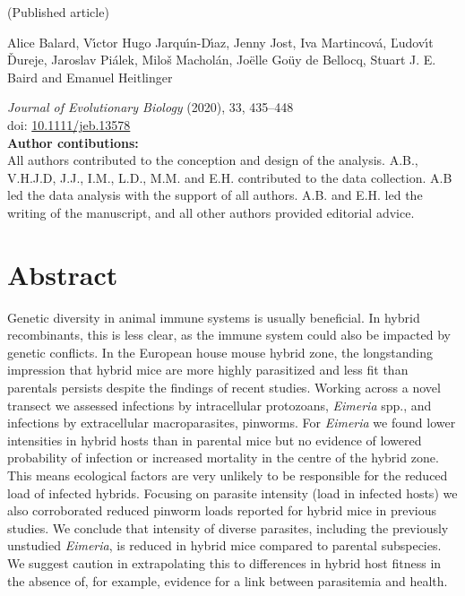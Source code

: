 (Published article) \par

Alice Balard, V{\'{\i}}ctor Hugo Jarqu{\'{\i}}n-D{\'{\i}}az, Jenny Jost, Iva Martincov{\'{a}}, {\v{L}}udov{\'{\i}}t {\v{D}}ureje, Jaroslav Pi{\'{a}}lek, Milo{\v{s}} Machol{\'{a}}n, Joëlle Go\"{u}y de Bellocq, Stuart J. E. Baird and Emanuel Heitlinger \par
  
\textit{Journal of Evolutionary Biology} (2020), 33, 435–448 \\
doi: \url{10.1111/jeb.13578}\\

\textbf{Author contibutions:}\\
All authors contributed to the conception and design of the analysis. A.B., V.H.J.D, J.J., I.M., L.D., M.M. and E.H. contributed to the data collection. A.B led the data analysis with the support of all authors. A.B. and E.H. led the writing of the manuscript, and all other authors provided editorial advice. \par

\newpage

\section{Abstract}
Genetic diversity in animal immune systems is usually beneficial. In hybrid recombinants, this is less clear, as the immune system could also be impacted by genetic conflicts. In the European house mouse hybrid zone, the longstanding impression that hybrid mice are more highly parasitized and less fit than parentals persists despite the findings of recent studies. Working across a novel transect we assessed infections by intracellular protozoans, \textit{Eimeria} spp., and infections by extracellular macroparasites, pinworms. For \textit{Eimeria} we found lower intensities in hybrid hosts than in parental mice but no evidence of lowered probability of infection or increased mortality in the centre of the hybrid zone. This means ecological factors are very unlikely to be responsible for the reduced load of infected hybrids. Focusing on parasite intensity (load in infected hosts) we also corroborated reduced pinworm loads reported for hybrid mice in previous studies. We conclude that intensity of diverse parasites, including the previously unstudied \textit{Eimeria}, is reduced in hybrid mice compared to parental subspecies. We suggest caution in extrapolating this to differences in hybrid host fitness in the absence of, for example, evidence for a link between parasitemia and health.

